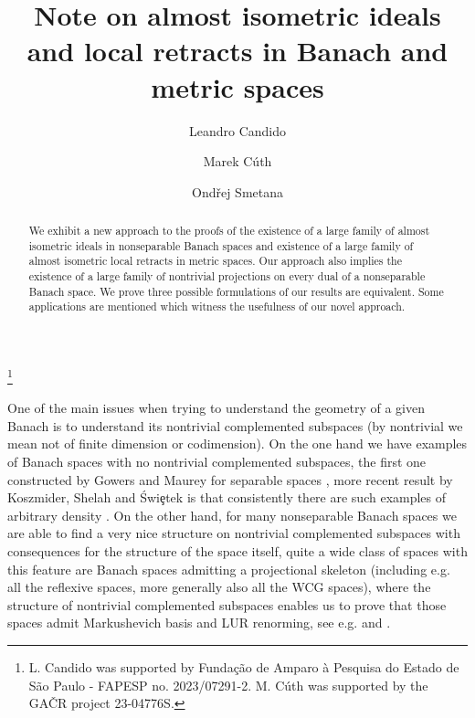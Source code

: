 \documentclass[11pt]{amsart}
\theoremstyle{definition}
\theoremstyle{remark}
\begin{document}
\title[Note on almost isometric ideals]{Note on almost isometric ideals and local retracts in Banach and metric spaces}

\author[L. Candido]{Leandro Candido}
\author[M. C\' uth]{Marek C\'uth}
\author[O. Smetana]{Ond\v{r}ej Smetana}

\address[L.~Candido]{Universidade Federal de S\~{a}o Paulo - UNIFESP. Instituto de Ci\^{e}ncia e Tecnologia. Departamento de Matematica. S\~{a}o Jos\'e dos Campos - SP, Brasil}

\address[M.~C\' uth, O.~Smetana]{Charles University, Faculty of Mathematics and Physics, Department of Mathematical Analysis, Sokolovsk\'a 83, 186 75 Prague 8, Czech Republic}


\thanks{L. Candido was supported by Funda\c c\~ao de Amparo \`a Pesquisa do Estado de S\~ao Paulo - FAPESP no. 2023/07291-2. M. C\'uth was supported by the GA\v{C}R project 23-04776S.}

\begin{abstract}
We exhibit a new approach to the proofs of the existence of a large family of almost isometric ideals in nonseparable Banach spaces and existence of a large family of almost isometric local retracts in metric spaces. Our approach also implies the existence of a large family of nontrivial projections on every dual of a nonseparable Banach space. We prove three possible formulations of our results are equivalent. Some applications are mentioned which witness the usefulness of our novel approach.
\end{abstract}
\maketitle

One of the main issues when trying to understand the geometry of a given Banach is to understand its nontrivial complemented subspaces (by nontrivial we mean not of finite dimension or codimension). On the one hand we have examples of Banach spaces with no nontrivial complemented subspaces, the first one constructed by Gowers and Maurey for separable spaces \cite{Gow93}, more recent result by Koszmider, Shelah and \'Swi\c{e}tek is that consistently there are such examples of arbitrary density \cite{KSS18}. On the other hand, for many nonseparable Banach spaces we are able to find a very nice structure on nontrivial complemented subspaces with consequences for the structure of the space itself, quite a wide class of spaces with this feature are Banach spaces admitting a projectional skeleton (including e.g. all the reflexive spaces, more generally also all the WCG spaces), where the structure of nontrivial complemented subspaces enables us to prove that those spaces admit Markushevich basis and LUR renorming, see e.g. \cite[Chapter 17]{KKLBook} and \cite{Kal20}.
\end{document}
